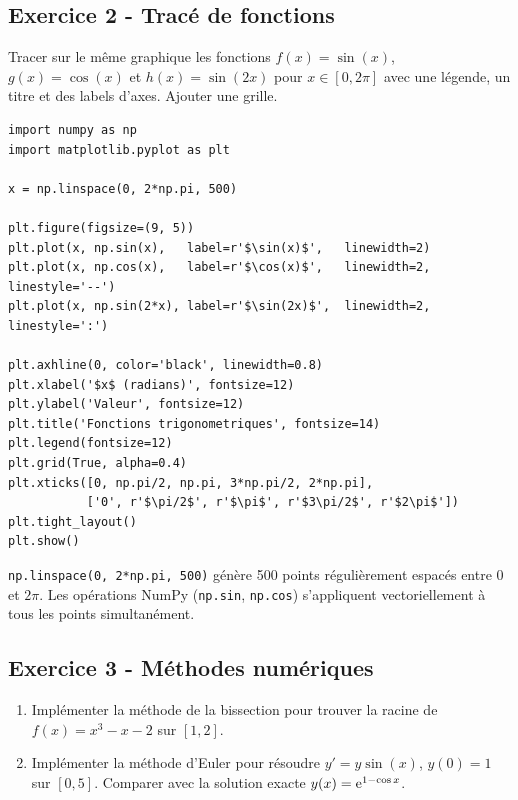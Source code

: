 \documentclass[12pt,a4paper]{article}
\begin{document}
\subsection*{Exercice 2 - Tracé de fonctions \niveau{\facile}}

\begin{boiteexercice}
Tracer sur le même graphique les fonctions $f(x)=\sin(x)$, $g(x)=\cos(x)$ et $h(x)=\sin(2x)$ pour $x\in[0,2\pi]$ avec une légende, un titre et des labels d'axes. Ajouter une grille.
\end{boiteexercice}

\begin{boitecorrige}
\begin{lstlisting}
import numpy as np
import matplotlib.pyplot as plt

x = np.linspace(0, 2*np.pi, 500)

plt.figure(figsize=(9, 5))
plt.plot(x, np.sin(x),   label=r'$\sin(x)$',   linewidth=2)
plt.plot(x, np.cos(x),   label=r'$\cos(x)$',   linewidth=2, linestyle='--')
plt.plot(x, np.sin(2*x), label=r'$\sin(2x)$',  linewidth=2, linestyle=':')

plt.axhline(0, color='black', linewidth=0.8)
plt.xlabel('$x$ (radians)', fontsize=12)
plt.ylabel('Valeur', fontsize=12)
plt.title('Fonctions trigonometriques', fontsize=14)
plt.legend(fontsize=12)
plt.grid(True, alpha=0.4)
plt.xticks([0, np.pi/2, np.pi, 3*np.pi/2, 2*np.pi],
           ['0', r'$\pi/2$', r'$\pi$', r'$3\pi/2$', r'$2\pi$'])
plt.tight_layout()
plt.show()
\end{lstlisting}

\texttt{np.linspace(0, 2*np.pi, 500)} génère 500 points régulièrement espacés entre 0 et $2\pi$. Les opérations NumPy (\texttt{np.sin}, \texttt{np.cos}) s'appliquent vectoriellement à tous les points simultanément.
\end{boitecorrige}

\subsection*{Exercice 3 - Méthodes numériques \niveau{\moyen}}

\begin{boiteexercice}
\begin{enumerate}
  \item Implémenter la méthode de la bissection pour trouver la racine de $f(x)=x^3-x-2$ sur $[1,2]$.
  \item Implémenter la méthode d'Euler pour résoudre $y'=y\sin(x)$, $y(0)=1$ sur $[0,5]$. Comparer avec la solution exacte $y(x)=\mathrm{e}^{1-\cos x}$.
\end{enumerate}
\end{boiteexercice}
\end{document}
